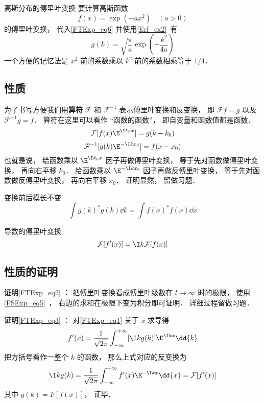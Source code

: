 \begin{example}{高斯分布的傅里叶变换}
要计算高斯函数
\begin{equation}
f(x) = \exp(-ax^2) \quad (a > 0)
\end{equation}
的傅里叶变换， 代入\autoref{FTExp_eq6} 并使用\autoref{Erf_ex2}~有
\begin{equation}
g(k) = \sqrt{\frac{\pi}{a}} \exp(-\frac{k^2}{4a})
\end{equation}
一个方便的记忆法是 $x^2$ 前的系数乘以 $k^2$ 前的系数相乘等于 $1/4$．
\end{example}

\subsection{性质}
为了书写方便我们用\textbf{算符} $\mathcal F$ 和 $\mathcal F^{-1}$ 表示傅里叶变换和反变换， 即 $\mathcal F f = g$ 以及 $\mathcal F^{-1} g = f$． 算符在这里可以看作 “函数的函数”， 即自变量和函数值都是函数．
\begin{equation}\label{FTExp_eq4}
\mathcal F [f(x) \E^{\I k_0 x}] = g(k - k_0)
\end{equation}
\begin{equation}
\mathcal F^{-1} [g(k) \E^{-\I k x_0}] = f(x - x_0)
\end{equation}
也就是说， 给函数乘以 $\E^{\I k_0 x}$ 因子再做傅里叶变换， 等于先对函数做傅里叶变换， 再向右平移 $k_0$． 给函数乘以 $\E^{-\I k x_0}$ 因子再做反傅里叶变换， 等于先对函数做反傅里叶变换， 再向右平移 $x_0$． 证明显然， 留做习题．

变换前后模长不变
\begin{equation}\label{FTExp_eq2}
\int g(k)^* g(k) \dd{k} = \int f(x)^* f(x) \dd{x}
\end{equation}

导数的傅里叶变换
\begin{equation}\label{FTExp_eq3}
\mathcal F [f'(x)] = \I k \mathcal F[f(x)]
\end{equation}

\subsection{性质的证明}

\textbf{证明}\autoref{FTExp_eq2} ： 把傅里叶变换看成傅里叶级数在 $l \to \infty$ 时的极限， 使用\autoref{FSExp_eq5}~， 右边的求和在极限下变为积分即可证明． 详细过程留做习题．

\textbf{证明}\autoref{FTExp_eq3} ： 对\autoref{FTExp_eq1} 关于 $x$ 求导得
\begin{equation}
f'(x) = \frac{1}{\sqrt{2\pi }} \int_{-\infty }^{+\infty } [\I kg(k)]\E^{\I kx} \dd{k}
\end{equation}
把方括号看作一整个 $k$ 的函数， 那么上式对应的反变换为
\begin{equation}
\I kg(k) = \frac{1}{\sqrt{2\pi }} \int_{-\infty }^{+\infty } f'(x) \E^{-\I kx} \dd{x} = \mathcal F [f'(x)]
\end{equation}
其中 $g(k) = F [f(x)]$， 证毕．
